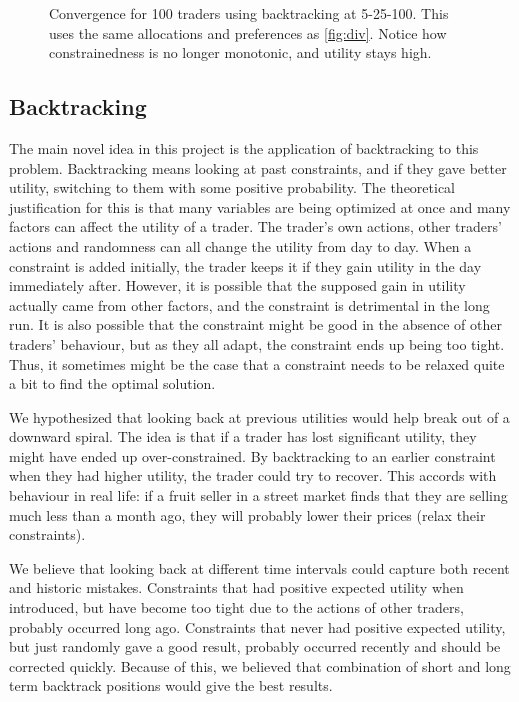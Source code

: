 \documentclass[12pt,a4paper,titlepage]{article}
\begin{document}
\begin{figure}[H]
    \centering
    
    \caption{
      Convergence for 100 traders using backtracking at 5-25-100.
      This uses the same allocations and preferences as \ref{fig:div}.
      Notice how constrainedness is no longer monotonic, and utility stays high.
    }
    \label{fig:back}
\end{figure}

\subsection{Backtracking}\label{backtrack}

The main novel idea in this project is the application of backtracking to this problem.
Backtracking means looking at past constraints, and if they gave better utility, switching to them with some positive probability.
The theoretical justification for this is that many variables are being optimized at once and many factors can affect the utility of a trader.
The trader's own actions, other traders' actions and randomness can all change the utility from day to day.
When a constraint is added initially, the trader keeps it if they gain utility in the day immediately after.
However, it is possible that the supposed gain in utility actually came from other factors, and the constraint is detrimental in the long run.
It is also possible that the constraint might be good in the absence of other traders' behaviour, but as they all adapt, the constraint ends up being too tight.
Thus, it sometimes might be the case that a constraint needs to be relaxed quite a bit to find the optimal solution.

We hypothesized that looking back at previous utilities would help break out of a downward spiral.
The idea is that if a trader has lost significant utility, they might have ended up over-constrained.
By backtracking to an earlier constraint when they had higher utility, the trader could try to recover.
This accords with behaviour in real life: if a fruit seller in a street market finds that they are selling much less than a month ago, they will probably lower their prices (relax their constraints).

We believe that looking back at different time intervals could capture both recent and historic mistakes.
Constraints that had positive expected utility when introduced, but have become too tight due to the actions of other traders, probably occurred long ago.
Constraints that never had positive expected utility, but just randomly gave a good result, probably occurred recently and should be corrected quickly.
Because of this, we believed that combination of short and long term backtrack positions would give the best results.
\end{document}
